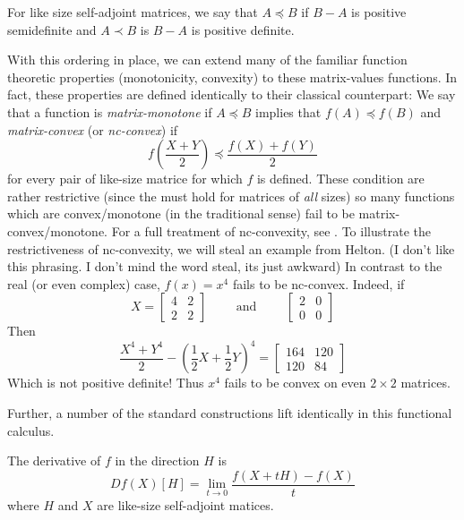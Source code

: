 \begin{definition}
\label{def:LoewnerOrder}
  For like size self-adjoint matrices, we say that \(A \preceq B\) if \(B - A \)
  is positive semidefinite and \(A \prec B\) is \(B-A\) is positive definite.
\end{definition}

With this ordering in place, we can extend many of the familiar function
theoretic properties (monotonicity, convexity) to these matrix-values functions.
In fact, these properties are defined identically to their classical counterpart:
We say that a function is \emph{matrix-monotone} if \(A \preceq B\) implies that
\(f(A) \preceq f(B)\) and \emph{matrix-convex} (or \emph{nc-convex}) if
\[
  f \left( \frac{X+Y}{2} \right) \preceq \frac{f(X)+f(Y)}{2}
\]
for every pair of like-size matrice for which \(f\) is defined. These condition
are rather restrictive (since the must hold for matrices of \emph{all} sizes) so
many functions which are convex/monotone (in the traditional sense) fail to be
matrix-convex/monotone. For a full treatment of nc-convexity, see
\cite{heltonFree2013}. To illustrate the restrictiveness of nc-convexity,
{\color{red} we will steal an example from Helton. (I don't like this phrasing. I don't
  mind the word steal, its just awkward)}
In contrast to the real (or even complex) case, \(f(x)=x^4\) fails to be nc-convex.
Indeed, if
\[
  X = \begin{bmatrix} 4 &2\\2&2 \end{bmatrix}  \qquad \text{ and } \qquad \begin{bmatrix} 2&0\\0&0 \end{bmatrix}
\]
Then
\[
  \frac{X^4+Y^4}{2} - \left( \frac{1}{2}X +\frac{1}{2}Y \right) ^4
  = \begin{bmatrix} 164 &120\\120&84 \end{bmatrix}
\]
Which is not positive definite! Thus \(x^4\) fails to be convex on even
\(2\times 2\) matrices.

Further, a number of the standard constructions lift identically in this
functional calculus.
\begin{definition}
  \label{def:DirDeriv}
  The derivative of \(f\) in the direction \(H\) is
  \[
    Df(X)[H] = \lim_{t \to 0} \frac{f(X+tH) - f(X)}{t}
  \]
  where \(H\) and \(X\) are like-size self-adjoint matices.
\end{definition}

